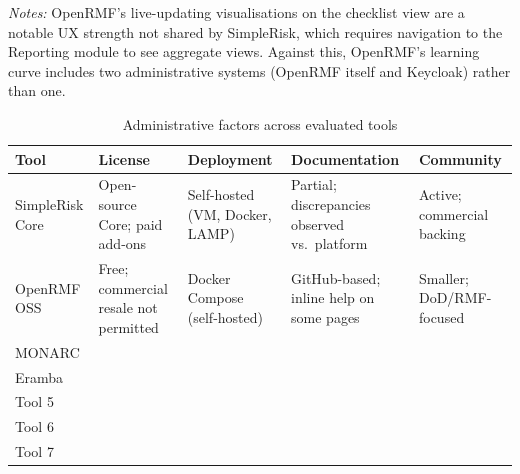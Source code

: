 \noindent\textit{Notes:} OpenRMF's live-updating visualisations on the
checklist view are a notable UX strength not shared by SimpleRisk, which
requires navigation to the Reporting module to see aggregate views. Against
this, OpenRMF's learning curve includes two administrative systems
(OpenRMF itself and Keycloak) rather than one.

\begin{table}[H]
\centering
\renewcommand{\arraystretch}{1.3}
\small
\caption{Administrative factors across evaluated tools}
\label{tab:comp-admin}
\begin{tabular}{|p{2.3cm}|p{2.8cm}|p{2.8cm}|p{2.5cm}|p{2.8cm}|}
\hline
\textbf{Tool} & \textbf{License} & \textbf{Deployment} & \textbf{Documentation} & \textbf{Community} \\
\hline
SimpleRisk Core & Open-source Core; paid add-ons & Self-hosted (VM, Docker, LAMP) & Partial; discrepancies observed vs.\ platform & Active; commercial backing \\
\hline
OpenRMF OSS    & Free; commercial resale not permitted & Docker Compose (self-hosted) & GitHub-based; inline help on some pages & Smaller; DoD/RMF-focused \\
\hline
MONARC         & & & & \\
\hline
Eramba         & & & & \\
\hline
Tool 5         & & & & \\
\hline
Tool 6         & & & & \\
\hline
Tool 7         & & & & \\
\hline
\end{tabular}
\end{table}
